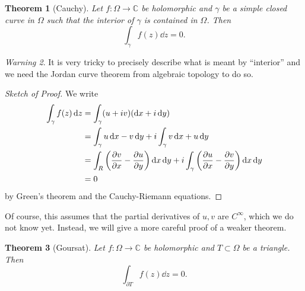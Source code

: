 \documentclass[leqno, openany]{memoir}
\newtheorem{thm}{Theorem}[section]
\theoremstyle{definition}
\theoremstyle{remark}
\newtheorem{warn}[thm]{Warning}
\theoremstyle{plain}
\theoremstyle{definition}
\theoremstyle{remark}
\newcommand{\C}{\mathbb{C}}
\begin{document}
\begin{thm}[Cauchy] Let $f \colon \Omega \to \C$ be holomorphic and $\gamma$ be
    a simple closed curve in $\Omega$ such that the interior of $\gamma$ is
    contained in $\Omega$. Then \[ \int_{\gamma} f(z) \dd{z} = 0. \] \end{thm}

\begin{warn} It is very tricky to precisely describe what is meant by
``interior'' and we need the Jordan curve theorem from algebraic topology to do
so.  \end{warn}

\begin{proof}[Sketch of Proof] We write \begin{align*} \int_{\gamma} f(z)
    \dd{z} &= \int_{\gamma} (u+iv) (\dd{x} + i \dd{y}) \\ &= \int_{\gamma} u
    \dd{x} - v \dd{y} + i \int_{\gamma} v \dd{x} + u \dd{y} \\ &= \int_R
    \qty(\pdv{v}{x} - \pdv{u}{y}) \dd{x} \dd{y} + i \int_{\gamma}
    \qty(\pdv{u}{x} - \pdv{v}{y}) \dd{x} \dd{y} \\ &= 0 \end{align*} by Green's
theorem and the Cauchy-Riemann equations.  \end{proof}

Of course, this assumes that the partial derivatives of $u,v$ are $C^{\infty}$,
which we do not know yet. Instead, we will give a more careful proof of a
weaker theorem.

\begin{thm}[Goursat] Let $f \colon \Omega \to \C$ be holomorphic and $T \subset
    \Omega$ be a triangle. Then \[ \int_{\partial T} f(z) \dd{z} = 0. \]
\end{thm}
\end{document}

